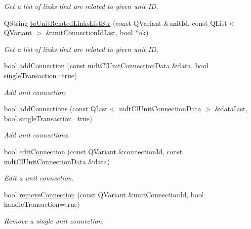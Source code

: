 \begin{DoxyCompactItemize}
\begin{DoxyCompactList}\small\item\em Get a list of links that are related to given unit I\-D. \end{DoxyCompactList}\item 
Q\-String \hyperlink{classmdt_cl_unit_af87a65741ba7a6aa9f47a996005a9c3a}{to\-Unit\-Related\-Links\-List\-Str} (const Q\-Variant \&unit\-Id, const Q\-List$<$ Q\-Variant $>$ \&unit\-Connection\-Id\-List, bool $\ast$ok)
\begin{DoxyCompactList}\small\item\em Get a list of links that are related to given unit I\-D. \end{DoxyCompactList}\item 
bool \hyperlink{classmdt_cl_unit_a42b6918f809126d4ca1002c343f90316}{add\-Connection} (const \hyperlink{classmdt_cl_unit_connection_data}{mdt\-Cl\-Unit\-Connection\-Data} \&data, bool single\-Transaction=true)
\begin{DoxyCompactList}\small\item\em Add unit connection. \end{DoxyCompactList}\item 
bool \hyperlink{classmdt_cl_unit_a23c85173bd518a70e8fbae27f3e121ad}{add\-Connections} (const Q\-List$<$ \hyperlink{classmdt_cl_unit_connection_data}{mdt\-Cl\-Unit\-Connection\-Data} $>$ \&data\-List, bool single\-Transaction=true)
\begin{DoxyCompactList}\small\item\em Add unit connections. \end{DoxyCompactList}\item 
bool \hyperlink{classmdt_cl_unit_aac3afb2a4895a16f637b765b44cbca9e}{edit\-Connection} (const Q\-Variant \&connection\-Id, const \hyperlink{classmdt_cl_unit_connection_data}{mdt\-Cl\-Unit\-Connection\-Data} \&data)
\begin{DoxyCompactList}\small\item\em Edit a unit connection. \end{DoxyCompactList}\item 
bool \hyperlink{classmdt_cl_unit_aa4b4f148293abc335704515251ed4f5b}{remove\-Connection} (const Q\-Variant \&unit\-Connection\-Id, bool handle\-Transaction=true)
\begin{DoxyCompactList}\small\item\em Remove a single unit connection. \end{DoxyCompactList}\item 

\end{DoxyCompactItemize}

